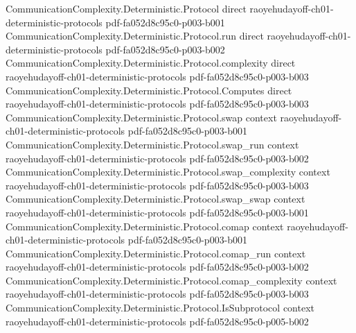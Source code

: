 \begin{theorem}
\label{CommunicationComplexity.Functions.Equality.communicationComplexity_le}
\leanok
{}
\proofstep
  {CommunicationComplexity.Deterministic.Protocol}
  {direct}
  {raoyehudayoff-ch01-deterministic-protocols}
  {pdf-fa052d8c95c0-p003-b001}
\proofstep
  {CommunicationComplexity.Deterministic.Protocol.run}
  {direct}
  {raoyehudayoff-ch01-deterministic-protocols}
  {pdf-fa052d8c95c0-p003-b002}
\proofstep
  {CommunicationComplexity.Deterministic.Protocol.complexity}
  {direct}
  {raoyehudayoff-ch01-deterministic-protocols}
  {pdf-fa052d8c95c0-p003-b003}
\proofstep
  {CommunicationComplexity.Deterministic.Protocol.Computes}
  {direct}
  {raoyehudayoff-ch01-deterministic-protocols}
  {pdf-fa052d8c95c0-p003-b003}
\proofstep
  {CommunicationComplexity.Deterministic.Protocol.swap}
  {context}
  {raoyehudayoff-ch01-deterministic-protocols}
  {pdf-fa052d8c95c0-p003-b001}
\proofstep
  {CommunicationComplexity.Deterministic.Protocol.swap_run}
  {context}
  {raoyehudayoff-ch01-deterministic-protocols}
  {pdf-fa052d8c95c0-p003-b002}
\proofstep
  {CommunicationComplexity.Deterministic.Protocol.swap_complexity}
  {context}
  {raoyehudayoff-ch01-deterministic-protocols}
  {pdf-fa052d8c95c0-p003-b003}
\proofstep
  {CommunicationComplexity.Deterministic.Protocol.swap_swap}
  {context}
  {raoyehudayoff-ch01-deterministic-protocols}
  {pdf-fa052d8c95c0-p003-b001}
\proofstep
  {CommunicationComplexity.Deterministic.Protocol.comap}
  {context}
  {raoyehudayoff-ch01-deterministic-protocols}
  {pdf-fa052d8c95c0-p003-b001}
\proofstep
  {CommunicationComplexity.Deterministic.Protocol.comap_run}
  {context}
  {raoyehudayoff-ch01-deterministic-protocols}
  {pdf-fa052d8c95c0-p003-b002}
\proofstep
  {CommunicationComplexity.Deterministic.Protocol.comap_complexity}
  {context}
  {raoyehudayoff-ch01-deterministic-protocols}
  {pdf-fa052d8c95c0-p003-b003}
\proofstep
  {CommunicationComplexity.Deterministic.Protocol.IsSubprotocol}
  {context}
  {raoyehudayoff-ch01-deterministic-protocols}
  {pdf-fa052d8c95c0-p005-b002}

\end{theorem}
